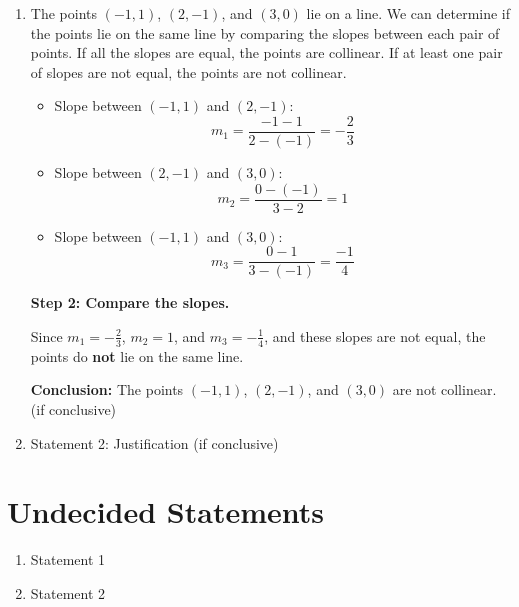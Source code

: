 \documentclass{article}
\begin{document}
\begin{enumerate}
    \item The points $(-1,1)$, $(2,-1)$, and $(3,0)$ lie on a line.\newline
          We can determine if the points lie on the same line by comparing the slopes between each pair of points.
          If all the slopes are equal, the points are collinear.
          If at least one pair of slopes are not equal, the points are not collinear.

          \begin{itemize}
              \item Slope between \((-1, 1)\) and \((2, -1)\):
                    \[
                        m_1 = \frac{-1 - 1}{2 - (-1)} = -\frac{2}{3}
                    \]

              \item Slope between \((2, -1)\) and \((3, 0)\):
                    \[
                        m_2 = \frac{0 - (-1)}{3 - 2} = 1
                    \]

              \item Slope between \((-1, 1)\) and \((3, 0)\):
                    \[
                        m_3 = \frac{0 - 1}{3 - (-1)} = \frac{-1}{4}
                    \]
          \end{itemize}

          \textbf{Step 2: Compare the slopes.}

          Since \(m_1 = -\frac{2}{3}\), \(m_2 = 1\), and \(m_3 = -\frac{1}{4}\), and these slopes are not equal, the points do \textbf{not} lie on the same line.

          \textbf{Conclusion:} The points \((-1, 1)\), \((2, -1)\), and \((3, 0)\) are not collinear.  (if conclusive)
    \item Statement 2: Justification (if conclusive)
\end{enumerate}

\section{Undecided Statements}

\begin{enumerate}
    \item Statement 1
    \item Statement 2
\end{enumerate}
\end{document}
